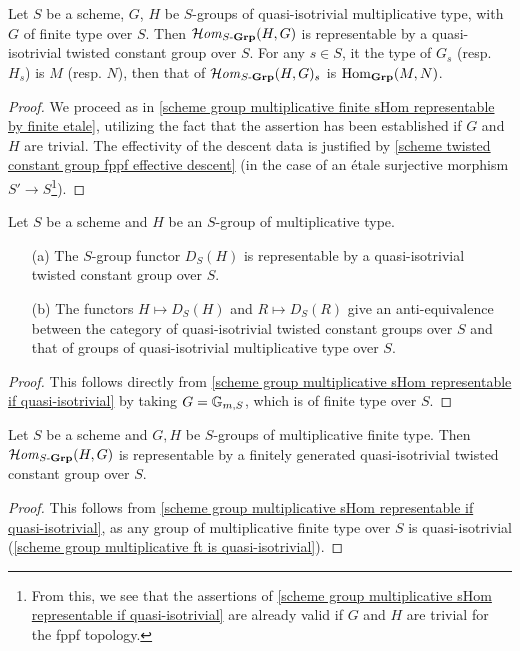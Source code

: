 \begin{theorem}\label{scheme group multiplicative sHom representable if quasi-isotrivial}
Let $S$ be a scheme, $G$, $H$ be $S$-groups of quasi-isotrivial multiplicative type, with $G$ of finite type over $S$. Then $\operatorname{\mathcal{H}\hspace*{-0.4pt}\textit{om}\hspace{0.5pt}}_{S\textup{-}\mathbf{Grp}}(H,G)$ is representable by a quasi-isotrivial twisted constant group over $S$. For any $s\in S$, it the type of $G_s$ (resp. $H_s$) is $M$ (resp. $N$), then that of $\operatorname{\mathcal{H}\hspace*{-0.4pt}\textit{om}\hspace{0.5pt}}_{S\textup{-}\mathbf{Grp}}(H,G)_s$ is $\mathrm{Hom}_{\mathbf{Grp}}(M,N)$.
\end{theorem}
\begin{proof}
We proceed as in \cref{scheme group multiplicative finite sHom representable by finite etale}, utilizing the fact that the assertion has been established if $G$ and $H$ are trivial. The effectivity of the descent data is justified by \cref{scheme twisted constant group fppf effective descent} (in the case of an \'etale surjective morphism $S'\to S$\footnote{From this, we see that the assertions of \cref{scheme group multiplicative sHom representable if quasi-isotrivial} are already valid if $G$ and $H$ are trivial for the fppf topology.}).
\end{proof}

\begin{corollary}\label{scheme group multiplicative D_S representable if quasi-isotrivial}
Let $S$ be a scheme and $H$ be an $S$-group of multiplicative type.
\begin{enumerate}
    \item[(a)] The $S$-group functor $D_S(H)$ is representable by a quasi-isotrivial twisted constant group over $S$.
    \item[(b)] The functors $H\mapsto D_S(H)$ and $R\mapsto D_S(R)$ give an anti-equivalence between the category of quasi-isotrivial twisted constant groups over $S$ and that of groups of quasi-isotrivial multiplicative type over $S$.
\end{enumerate}
\end{corollary}
\begin{proof}
This follows directly from \cref{scheme group multiplicative sHom representable if quasi-isotrivial} by taking $G=\mathbb{G}_{m,S}$, which is of finite type over $S$.
\end{proof}

\begin{corollary}\label{scheme group multiplicative ft sHom representable}
Let $S$ be a scheme and $G,H$ be $S$-groups of multiplicative finite type. Then $\operatorname{\mathcal{H}\hspace*{-0.4pt}\textit{om}\hspace{0.5pt}}_{S\textup{-}\mathbf{Grp}}(H,G)$ is representable by a finitely generated quasi-isotrivial twisted constant group over $S$.
\end{corollary}
\begin{proof}
This follows from \cref{scheme group multiplicative sHom representable if quasi-isotrivial}, as any group of multiplicative finite type over $S$ is quasi-isotrivial (\cref{scheme group multiplicative ft is quasi-isotrivial}).
\end{proof}

